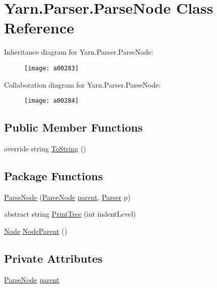 \hypertarget{a00063}{\section{Yarn.\-Parser.\-Parse\-Node Class Reference}
\label{a00063}
}


Inheritance diagram for Yarn.\-Parser.\-Parse\-Node\-:
\nopagebreak
\begin{figure}[H]
\begin{center}
\leavevmode
\texttt{[image: a00283]}
\end{center}
\end{figure}


Collaboration diagram for Yarn.\-Parser.\-Parse\-Node\-:
\nopagebreak
\begin{figure}[H]
\begin{center}
\leavevmode
\texttt{[image: a00284]}
\end{center}
\end{figure}
\subsection*{Public Member Functions}
\begin{DoxyCompactItemize}
\item 
override string \hyperlink{a00063_a18c67cb16090d0889bb9d6c8c6c565f8}{To\-String} ()
\end{DoxyCompactItemize}
\subsection*{Package Functions}
\begin{DoxyCompactItemize}
\item 
\hyperlink{a00063_a9e7e90bbaed268529230512e4b5a2f77}{Parse\-Node} (\hyperlink{a00063}{Parse\-Node} \hyperlink{a00063_af313a82103fcc2ff5a177dbb06b92f7b}{parent}, \hyperlink{a00064}{Parser} p)
\item 
abstract string \hyperlink{a00063_a0d6611653f20c2e4d90a97a96c657137}{Print\-Tree} (int indent\-Level)
\item 
\hyperlink{a00054}{Node} \hyperlink{a00063_a580e520a29444fc23ac3660cbe514a09}{Node\-Parent} ()
\end{DoxyCompactItemize}
\subsection*{Private Attributes}
\begin{DoxyCompactItemize}
\item 
\hyperlink{a00063}{Parse\-Node} \hyperlink{a00063_af313a82103fcc2ff5a177dbb06b92f7b}{parent}
\end{DoxyCompactItemize}


